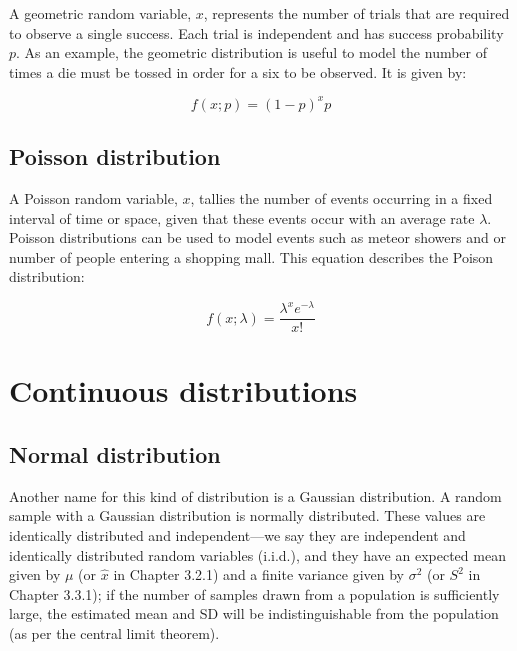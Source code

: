 \documentclass[english,10pt,a4paper,oneside]{book}
\theoremstyle{definition}
\theoremstyle{definition}
\theoremstyle{definition}
\theoremstyle{remark}
\begin{document}
A geometric random variable, \(x\), represents the number of trials that
are required to observe a single success. Each trial is independent and
has success probability \(p\). As an example, the geometric distribution
is useful to model the number of times a die must be tossed in order for
a six to be observed. It is given by:

\[f(x;p)=(1-p)^{x}p\]

\hypertarget{poisson-distribution}{%
\subsection{Poisson distribution}\label{poisson-distribution}}

A Poisson random variable, \(x\), tallies the number of events occurring
in a fixed interval of time or space, given that these events occur with
an average rate \(\lambda\). Poisson distributions can be used to model
events such as meteor showers and or number of people entering a
shopping mall. This equation describes the Poison distribution:

\[f(x;\lambda)=\frac{\lambda^{x}e^{-\lambda}}{x!}\]

\hypertarget{continuous-distributions}{%
\section{Continuous distributions}\label{continuous-distributions}}

\hypertarget{normal-distribution}{%
\subsection{Normal distribution}\label{normal-distribution}}

Another name for this kind of distribution is a Gaussian distribution. A
random sample with a Gaussian distribution is normally distributed.
These values are identically distributed and independent---we say they
are independent and identically distributed random variables (i.i.d.),
and they have an expected mean given by \(\mu\) (or \(\hat{x}\) in
Chapter 3.2.1) and a finite variance given by \(\sigma^{2}\) (or
\(S^{2}\) in Chapter 3.3.1); if the number of samples drawn from a
population is sufficiently large, the estimated mean and SD will be
indistinguishable from the population (as per the central limit
theorem).
\end{document}
